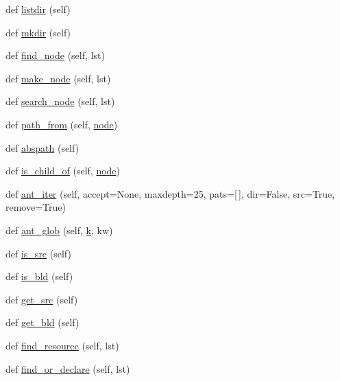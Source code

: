 \begin{DoxyCompactItemize}
def \hyperlink{classwaflib_1_1_node_1_1_node_a70c5530ee0dc91ddd80178d039c04d94}{listdir} (self)
\item 
def \hyperlink{classwaflib_1_1_node_1_1_node_a93340e13646660f3835b0c11e133bb64}{mkdir} (self)
\item 
def \hyperlink{classwaflib_1_1_node_1_1_node_a9ab508cb5f7d7069e8575d4d660c8379}{find\+\_\+node} (self, lst)
\item 
def \hyperlink{classwaflib_1_1_node_1_1_node_a347043d52fc2dee925ef027973e01134}{make\+\_\+node} (self, lst)
\item 
def \hyperlink{classwaflib_1_1_node_1_1_node_a67385f1721014aa606e2d7b25687a40f}{search\+\_\+node} (self, lst)
\item 
def \hyperlink{classwaflib_1_1_node_1_1_node_a2994cfc8043e1f27b8873e340a885788}{path\+\_\+from} (self, \hyperlink{structnode}{node})
\item 
def \hyperlink{classwaflib_1_1_node_1_1_node_aa0164267912895aeb986fdbfcf945159}{abspath} (self)
\item 
def \hyperlink{classwaflib_1_1_node_1_1_node_abc781098e2dcdd15feea5901ea2e23af}{is\+\_\+child\+\_\+of} (self, \hyperlink{structnode}{node})
\item 
def \hyperlink{classwaflib_1_1_node_1_1_node_a06da7a2c94996ada3d100721b5cf831e}{ant\+\_\+iter} (self, accept=None, maxdepth=25, pats=\mbox{[}$\,$\mbox{]}, dir=False, src=True, remove=True)
\item 
def \hyperlink{classwaflib_1_1_node_1_1_node_a5d9b6cac9100b15869f68df28f1d8cb4}{ant\+\_\+glob} (self, \hyperlink{rfft2d_test_m_l_8m_adc468c70fb574ebd07287b38d0d0676d}{k}, kw)
\item 
def \hyperlink{classwaflib_1_1_node_1_1_node_ae47c79cf11fd975ccd2a7316eda8b892}{is\+\_\+src} (self)
\item 
def \hyperlink{classwaflib_1_1_node_1_1_node_ac800b56240d593327ff3f3f17c58313d}{is\+\_\+bld} (self)
\item 
def \hyperlink{classwaflib_1_1_node_1_1_node_a7f7ca00eb49c81382a69e032b5229ea6}{get\+\_\+src} (self)
\item 
def \hyperlink{classwaflib_1_1_node_1_1_node_a181e1ee8473df6b270153d1b071d4dc0}{get\+\_\+bld} (self)
\item 
def \hyperlink{classwaflib_1_1_node_1_1_node_a72b22d40cbdffb458638abb21d706ff8}{find\+\_\+resource} (self, lst)
\item 
def \hyperlink{classwaflib_1_1_node_1_1_node_aca7db00cba3cae363d3b5f689ce10828}{find\+\_\+or\+\_\+declare} (self, lst)
\item 

\end{DoxyCompactItemize}

